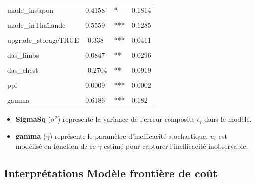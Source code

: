 \documentclass[
  12pt,
]{report}
\begin{document}
\begin{table}[!h]
\begin{tabular}[t]{llll}
made\_inJapon & 0.4158 & * & 0.1814\\
\addlinespace
\cellcolor{gray!6}{made\_inTaïwan} & \cellcolor{gray!6}{0.5101} & \cellcolor{gray!6}{*} & \cellcolor{gray!6}{0.2233}\\
made\_inThaïlande & 0.5559 & *** & 0.1285\\
\cellcolor{gray!6}{made\_inViêt Nam} & \cellcolor{gray!6}{-0.1071} & \cellcolor{gray!6}{} & \cellcolor{gray!6}{0.0576}\\
upgrade\_storageTRUE & -0.338 & *** & 0.0411\\
\cellcolor{gray!6}{das\_head} & \cellcolor{gray!6}{-0.2046} & \cellcolor{gray!6}{***} & \cellcolor{gray!6}{0.0587}\\
\addlinespace
das\_limbs & 0.0847 & ** & 0.0296\\
\cellcolor{gray!6}{fast\_chargingTRUE} & \cellcolor{gray!6}{-0.1595} & \cellcolor{gray!6}{**} & \cellcolor{gray!6}{0.057}\\
das\_chest & -0.2704 & ** & 0.0919\\
\cellcolor{gray!6}{network5G} & \cellcolor{gray!6}{0.305} & \cellcolor{gray!6}{***} & \cellcolor{gray!6}{0.0353}\\
ppi & 0.0009 & *** & 0.0002\\
\addlinespace
\cellcolor{gray!6}{sigmaSq} & \cellcolor{gray!6}{0.0762} & \cellcolor{gray!6}{***} & \cellcolor{gray!6}{0.0162}\\
gamma & 0.6186 & *** & 0.182\\
\bottomrule
\end{tabular}
\end{table}

\begin{itemize}
\item
  \textbf{SigmaSq} (\(\sigma^2\)) représente la variance de l'erreur
  composite \(\epsilon_i\) dans le modèle.
\item
  \textbf{gamma} (\(\gamma\)) représente le paramètre d'inefficacité
  stochastique. \(u_i\)\hspace{0pt} est modélisé en fonction de ce
  \(\gamma\) estimé pour capturer l'inefficacité inobservable.
\end{itemize}

\newpage

\subsection{Interprétations Modèle frontière de
coût}\label{interpruxe9tations-moduxe8le-frontiuxe8re-de-couxfbt}
\end{document}
